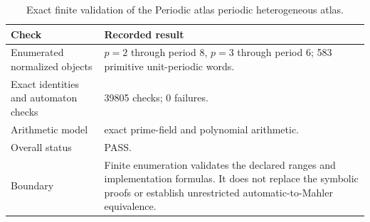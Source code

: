 \begin{table}[htbp]
\centering
\caption{Exact finite validation of the Periodic atlas periodic heterogeneous atlas.}
\label{tab:block03-validation}
\small
\begin{tabularx}{\textwidth}{@{}L{0.28\textwidth}Y@{}}
\toprule
Check & Recorded result\\
\midrule
Enumerated normalized objects & $p=2$ through period 8, $p=3$ through period 6; 583 primitive unit-periodic words.\\
Exact identities and automaton checks & 39805 checks; 0 failures.\\
Arithmetic model & exact prime-field and polynomial arithmetic.\\
Overall status & PASS.\\
Boundary & Finite enumeration validates the declared ranges and implementation formulas. It does not replace the symbolic proofs or establish unrestricted automatic-to-Mahler equivalence.\\
\bottomrule
\end{tabularx}
\end{table}
